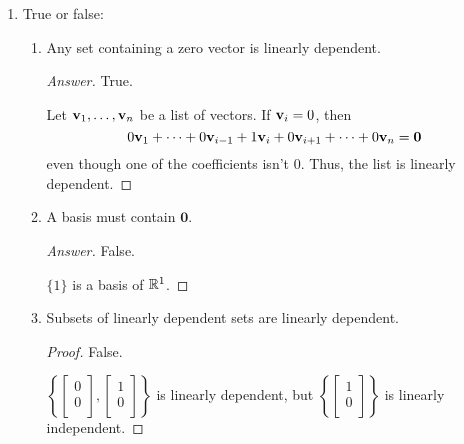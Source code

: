 \documentclass[../psets.tex]{subfiles}
\begin{document}
\begin{enumerate}[label={\textbf{2.\arabic*.}}]
    \item True or false:
    \begin{enumerate}
        \item Any set containing a zero vector is linearly dependent.
        \begin{proof}[Answer]
            True.\par
            Let $\mathbf{v}_1,\dots,\mathbf{v}_n$ be a list of vectors. If $\mathbf{v}_i=0$, then
            \begin{equation*}
                0\mathbf{v}_1+\cdots+0\mathbf{v}_{i-1}+1\mathbf{v}_i+0\mathbf{v}_{i+1}+\cdots+0\mathbf{v}_n = \bm{0}
            \end{equation*}
            even though one of the coefficients isn't 0. Thus, the list is linearly dependent.
        \end{proof}
        \item A basis must contain $\bm{0}$.
        \begin{proof}[Answer]
            False.\par
            $\{1\}$ is a basis of $\mathbb{R}^1$.
        \end{proof}
        \item Subsets of linearly dependent sets are linearly dependent.
        \begin{proof}
            False.\par
            $
                \left\{ \left[
                    \begin{smallmatrix}
                        0\\
                        0\\
                    \end{smallmatrix}
                \right],\left[
                    \begin{smallmatrix}
                        1\\
                        0\\
                    \end{smallmatrix}
                \right] \right\}
            $ is linearly dependent, but $
                \left\{ \left[
                    \begin{smallmatrix}
                        1\\
                        0\\
                    \end{smallmatrix}
                \right] \right\}
            $ is linearly independent.

\end{proof}
\end{enumerate}
\end{enumerate}
\end{document}
